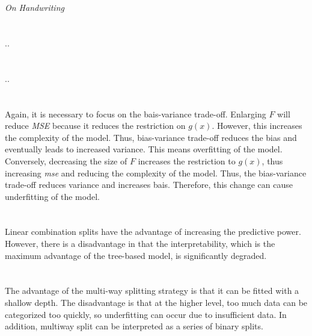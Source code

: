 \documentclass[11pt,a4paper]{article}
\begin{document}
\section{}

\emph{On Handwriting}

\section{}

..

\section{}

..

\section{}

Again, it is necessary to focus on the bais-variance trade-off. 
Enlarging \(F\) will reduce \emph{MSE} because it reduces the restriction on \(g(x)\). However, this increases the complexity of the model. Thus, bias-variance trade-off reduces the bias and eventually leads to increased variance. This means overfitting of the model.
Conversely, decreasing the size of \(F\) increases the restriction to \(g(x)\), thus increasing \emph{mse} and reducing the complexity of the model. Thus, the bias-variance trade-off reduces variance and increases bais. Therefore, this change can cause underfitting of the model.

\section{}

Linear combination splits have the advantage of increasing the predictive power. However, there is a disadvantage in that the interpretability, which is the maximum advantage of the tree-based model, is significantly degraded.

\section{}

The advantage of the multi-way splitting strategy is that it can be fitted with a shallow depth. The disadvantage is that at the higher level, too much data can be categorized too quickly, so underfitting can occur due to insufficient data. In addition, multiway split can be interpreted as a series of binary splits.
\end{document}
